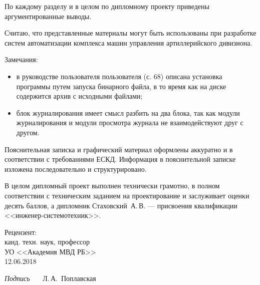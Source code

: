 \begin{singlespace}
{  По каждому разделу и в целом по дипломному проекту приведены аргументированные выводы.

  Считаю, что представленные материалы могут быть использованы при разработке систем автоматизации комплекса машин
	управления артиллерийского дивизиона.

  Замечания:
  \begin{itemize}
	  \item в руководстве пользователя пользователя (с. 68) описана установка программы путем запуска бинарного
		  файла, в то время как на диске содержится архив с исходными файлами;
	  \item блок журналирования имеет смысл разбить на два блока, так как модули журналирования и модули просмотра
		  журнала не взаимодействуют друг с другом.
  \end{itemize}

  Пояснительная записка и графический материал оформлены аккуратно и в соответствии с требованиями ЕСКД. Информация в
  пояснительной записке изложена последовательно и структурировано.

  В целом дипломный проект выполнен технически грамотно, в полном соответствии с техническим заданием на проектирование
	и заслуживает оценки десять баллов, а дипломник Стаховский~А.\,В. --- присвоения квалификации
	<<инженер-системотехник>>.

  \vfill
  \noindent
  \begin{minipage}{0.4\textwidth}
      \setlength{\parindent}{7ex}Рецензент:\\
      канд. техн. наук, профессор\\
      УО <<Академия МВД РБ>> \\
      12.06.2018
  \end{minipage}
  \begin{minipage}{0.58\textwidth}
    \begin{flushright}
	    \textit{Подпись}~~~ Л.\,А.~Поплавская \\
    \end{flushright}
  \end{minipage}
}

\end{singlespace}
\clearpage
